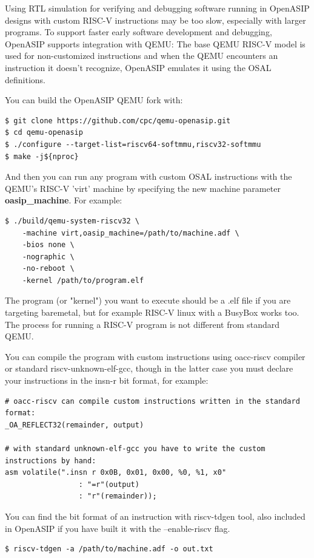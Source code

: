 \documentclass[a4paper,twoside]{tceusermanual}
\begin{document}
Using RTL simulation for verifying and debugging software running in OpenASIP 
designs with custom RISC-V instructions may be too slow, especially with 
larger programs. To support faster early software development and debugging, 
OpenASIP supports integration with QEMU: The base QEMU RISC-V model is used 
for non-customized instructions and when the QEMU encounters an instruction it 
doesn't recognize, OpenASIP emulates it using the OSAL definitions.

You can build the OpenASIP QEMU fork with:

\begin{verbatim}
$ git clone https://github.com/cpc/qemu-openasip.git
$ cd qemu-openasip 
$ ./configure --target-list=riscv64-softmmu,riscv32-softmmu
$ make -j${nproc}
\end{verbatim}

And then you can run any program with custom OSAL instructions with the QEMU's
RISC-V 'virt' machine by specifying the new machine parameter \textbf{oasip\_machine}.
For example:

\begin{verbatim}
$ ./build/qemu-system-riscv32 \
    -machine virt,oasip_machine=/path/to/machine.adf \
    -bios none \
    -nographic \
    -no-reboot \
    -kernel /path/to/program.elf
\end{verbatim}

The program (or "kernel") you want to execute should be a .elf file if you are targeting 
baremetal, but for example RISC-V linux with a BusyBox works too. The process 
for running a RISC-V program is not different from standard QEMU.

You can compile the program with custom instructions using oacc-riscv compiler 
or standard riscv-unknown-elf-gcc, though in the latter case you must declare 
your instructions in the insn-r bit format, for example:

\begin{verbatim}
# oacc-riscv can compile custom instructions written in the standard format:
_OA_REFLECT32(remainder, output)

# with standard unknown-elf-gcc you have to write the custom instructions by hand:
asm volatile(".insn r 0x0B, 0x01, 0x00, %0, %1, x0"
                 : "=r"(output)
                 : "r"(remainder));
\end{verbatim}

You can find the bit format of an instruction with riscv-tdgen tool, also included 
in OpenASIP if you have built it with the --enable-riscv flag.
\begin{verbatim}
$ riscv-tdgen -a /path/to/machine.adf -o out.txt
\end{verbatim}
\end{document}
